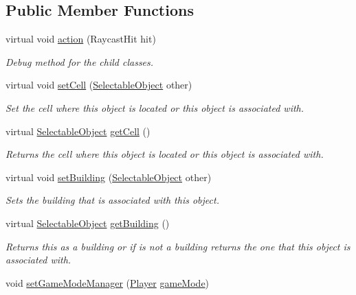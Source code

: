 \subsection*{Public Member Functions}
\begin{DoxyCompactItemize}
\item 
virtual void \mbox{\hyperlink{class_selectable_object_adb08e08703832f624d9bf62fc02208a8}{action}} (Raycast\+Hit hit)
\begin{DoxyCompactList}\small\item\em Debug method for the child classes. \end{DoxyCompactList}\item 
virtual void \mbox{\hyperlink{class_selectable_object_a8d56c05598d677cca9c8b06a774ee5a2}{set\+Cell}} (\mbox{\hyperlink{class_selectable_object}{Selectable\+Object}} other)
\begin{DoxyCompactList}\small\item\em Set the cell where this object is located or this object is associated with. \end{DoxyCompactList}\item 
virtual \mbox{\hyperlink{class_selectable_object}{Selectable\+Object}} \mbox{\hyperlink{class_selectable_object_a80e0f02ea8465ff2edfbaee1d5451dde}{get\+Cell}} ()
\begin{DoxyCompactList}\small\item\em Returns the cell where this object is located or this object is associated with. \end{DoxyCompactList}\item 
virtual void \mbox{\hyperlink{class_selectable_object_a3817f94af010c5cc5d2967a145b39f21}{set\+Building}} (\mbox{\hyperlink{class_selectable_object}{Selectable\+Object}} other)
\begin{DoxyCompactList}\small\item\em Sets the building that is associated with this object. \end{DoxyCompactList}\item 
virtual \mbox{\hyperlink{class_selectable_object}{Selectable\+Object}} \mbox{\hyperlink{class_selectable_object_a12caa058f4c53aa5debb1004f1169202}{get\+Building}} ()
\begin{DoxyCompactList}\small\item\em Returns this as a building or if is not a building returns the one that this object is associated with. \end{DoxyCompactList}\item 
void \mbox{\hyperlink{class_selectable_object_a049896cdcfa8970062bf5a5cb38b570b}{set\+Game\+Mode\+Manager}} (\mbox{\hyperlink{class_player}{Player}} \mbox{\hyperlink{class_selectable_object_ae127d54f7f6ac4f1655b1fa3f4dd480f}{game\+Mode}})

\end{DoxyCompactItemize}
